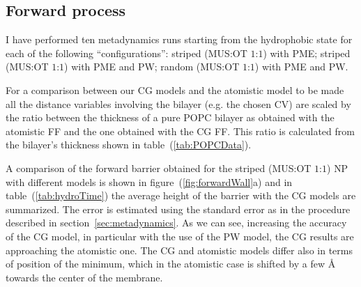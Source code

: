 %

\subsection{Forward process}
I have performed ten metadynamics runs starting from the hydrophobic state for each of the following ``configurations'': striped (\ac{MUS}:\ac{OT} $1$:$1$) with \ac{PME}; striped (\ac{MUS}:\ac{OT} $1$:$1$) with \ac{PME} and \ac{PW}; random (\ac{MUS}:\ac{OT} $1$:$1$) with \ac{PME} and \ac{PW}.

For a comparison between our \ac{CG} models and the atomistic model to be made all the distance variables involving the bilayer (e.g. the chosen \ac{CV}) are scaled by the ratio between the thickness of a pure \ac{POPC} bilayer as obtained with the atomistic \ac{FF} and the one obtained with the \ac{CG} \ac{FF}. This ratio is calculated from the bilayer's thickness shown in table~(\ref{tab:POPCData}).
 
A comparison of the forward barrier obtained for the striped (\ac{MUS}:\ac{OT} $1$:$1$) \ac{NP} with different models is shown in figure~(\ref{fig:forwardWall}a) and in table~(\ref{tab:hydroTime}) the average height of the barrier with the \ac{CG} models are summarized. The error is estimated using the standard error as in the procedure described in section~\ref{sec:metadynamics}. As we can see, increasing the accuracy of the \ac{CG} model, in particular with the use of the \ac{PW} model, the \ac{CG} results are approaching the atomistic one. The \ac{CG} and atomistic models differ also in terms of position of the minimum, which in the atomistic case is shifted by a few \r{A} towards the center of the membrane.

